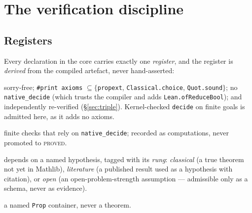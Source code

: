 \documentclass[11pt]{article}
\theoremstyle{definition}
\theoremstyle{remark}
\newcommand{\lean}[1]{\texttt{#1}}
\begin{document}
\section{The verification discipline}\label{sec:method}

\subsection{Registers}
Every declaration in the core carries exactly one \emph{register}, and the register is
\emph{derived} from the compiled artefact, never hand-asserted:
\begin{description}[leftmargin=*,itemsep=1pt]
  \item[\textsc{proved}] sorry-free; \lean{\#print axioms} $\subseteq\{$\lean{propext},
  \lean{Classical.choice}, \lean{Quot.sound}$\}$; no \lean{native\_decide} (which trusts the
  compiler and adds \lean{Lean.ofReduceBool}); and independently re-verified (\S\ref{sec:triple}).
  Kernel-checked \lean{decide} on finite goals is admitted here, as it adds no axioms.
  \item[\textsc{computation}] finite checks that rely on \lean{native\_decide}; recorded as
  computations, never promoted to \textsc{proved}.
  \item[\textsc{conditional}] depends on a named hypothesis, tagged with its \emph{rung}:
  \emph{classical} (a true theorem not yet in Mathlib), \emph{literature} (a published result
  used as a hypothesis with citation), or \emph{open} (an open-problem-strength assumption ---
  admissible only as a schema, never as evidence).
  \item[\textsc{conjecture}] a named \lean{Prop} container, never a theorem.
\end{description}
\end{document}
